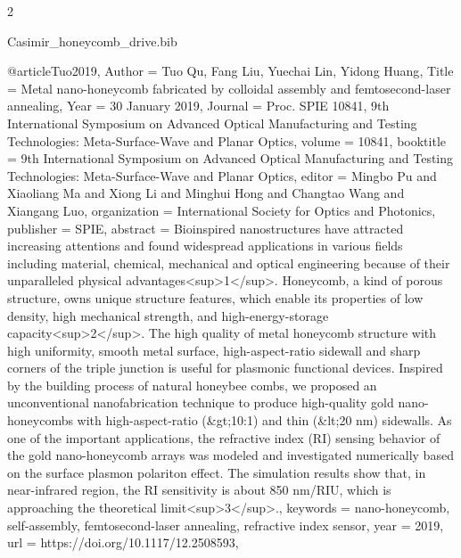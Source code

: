 \documentclass[twoside, 10pt]{article}
\def\myfilename{Casimir_honeycomb_drive}
\begin{document}
\begin{multicols}{2}
\begin{filecontents}{\myfilename.bib}

@article{Tuo2019,
    Author = {Tuo Qu, Fang Liu, Yuechai Lin, Yidong Huang},
    Title = {Metal nano-honeycomb fabricated by colloidal assembly and femtosecond-laser annealing},
    Year = {30 January 2019},
    Journal = {Proc. SPIE 10841, 9th International Symposium on Advanced Optical Manufacturing and Testing Technologies: Meta-Surface-Wave and Planar Optics},
    volume = {10841},
    booktitle = {9th International Symposium on Advanced Optical Manufacturing and Testing Technologies: Meta-Surface-Wave and Planar Optics},
    editor = {Mingbo Pu and Xiaoliang Ma and Xiong Li and Minghui Hong and Changtao Wang and Xiangang Luo},
    organization = {International Society for Optics and Photonics},
    publisher = {SPIE},
    abstract = {Bioinspired nanostructures have attracted increasing attentions and found widespread applications in various fields including material, chemical, mechanical and optical engineering because of their unparalleled physical advantages<sup>1</sup>. Honeycomb, a kind of porous structure, owns unique structure features, which enable its properties of low density, high mechanical strength, and high-energy-storage capacity<sup>2</sup>. The high quality of metal honeycomb structure with high uniformity, smooth metal surface, high-aspect-ratio sidewall and sharp corners of the triple junction is useful for plasmonic functional devices. Inspired by the building process of natural honeybee combs, we proposed an unconventional nanofabrication technique to produce high-quality gold nano-honeycombs with high-aspect-ratio (&gt;10:1) and thin (&lt;20 nm) sidewalls. As one of the important applications, the refractive index (RI) sensing behavior of the gold nano-honeycomb arrays was modeled and investigated numerically based on the surface plasmon polariton effect. The simulation results show that, in near-infrared region, the RI sensitivity is about 850 nm/RIU, which is approaching the theoretical limit<sup>3</sup>.},
    keywords = {nano-honeycomb, self-assembly, femtosecond-laser annealing, refractive index sensor},
    year = {2019},
    url = {https://doi.org/10.1117/12.2508593},
}


\end{filecontents}
\end{multicols}
\end{document}
